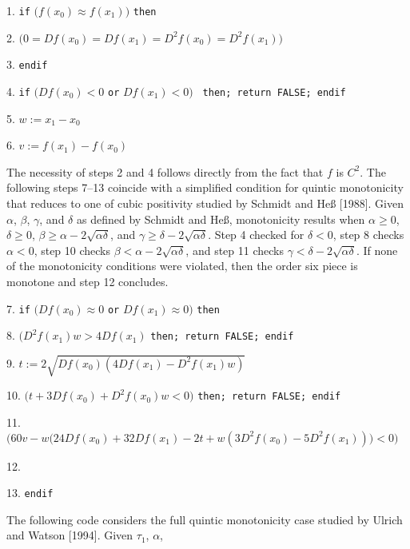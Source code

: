 {\parindent=6mm
\item{1.} {\tt if} $\big(f(x_0) \approx f(x_1)\big)$ {\tt then}
\item{2.}  $\big( 0 = Df(x_0) = Df(x_1)
  = D^2f(x_0) = D^2f(x_1) \big)$
\item{3.} {\tt endif}
\item{4.} {\tt if} $\big(Df(x_0) < 0$ {\tt or} $Df(x_1) < 0\big)$ {\tt
  then; return FALSE; endif}
\item{5.} $w := x_1 - x_0$
\item{6.} $v := f(x_1) - f(x_0)$ \vskip 1mm
\item{} {The necessity of steps 2 and 4 follows directly from
  the fact that $f$ is $C^2$. The following steps 7--13 coincide with
  a simplified condition for quintic monotonicity that reduces to one
  of cubic positivity studied by Schmidt and He{\ss} [1988]. Given
  $\alpha$, $\beta$, $\gamma$, and $\delta$ as defined by Schmidt and
  He{\ss}, monotonicity results when $\alpha \geq 0$, $\delta \geq 0$,
  $\beta \geq \alpha - 2 \sqrt{\alpha \delta}$, and $\gamma \geq
  \delta - 2 \sqrt{\alpha \delta}$.  Step 4 checked for $\delta < 0$,
  step 8 checks $\alpha < 0$, step 10 checks $\beta < \alpha - 2
  \sqrt{\alpha \delta}$, and step 11 checks $\gamma < \delta - 2
  \sqrt{\alpha \delta}$. If none of the monotonicity conditions were
  violated, then the order six piece is monotone and step 12
  concludes.} \vskip 1mm
\item{7.} {\tt if} $\big(Df(x_0) \approx 0$ {\tt or} $Df(x_1) \approx 0\big)$ {\tt then}
\item{8.}  $\big(D^2f(x_1)w > 4Df(x_1)$ {\tt then; return FALSE; endif}
\item{9.} \codent $t := 2 \sqrt{Df(x_0) \left(4Df(x_1) - D^2f(x_1) w \right)}$
\item{10.}  $\big(t + 3Df(x_0) + D^2f(x_0)w < 0 \big)$
  {\tt then; return FALSE; endif}
\item{11.}  $\big(60v - w\big(24Df(x_0) + 32Df(x_1) - 2t
  + w(3D^2f(x_0) - 5D^2f(x_1))\big) < 0\big)$
\item{}   \codent {}
\item{12.} 
\item{13.} {\tt endif} \vskip 1mm
\item{} {The following code considers the full quintic monotonicity
  case studied by Ulrich and Watson [1994]. Given $\tau_1$, $\alpha$,
}}
